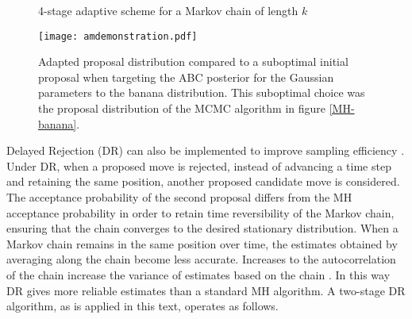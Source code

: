 \begin{figure}[h]
\begin{minipage}{1.0\linewidth}
\centering
\end{minipage}

\caption{4-stage adaptive scheme for a Markov chain of length $k$}
\label{4-stage-am}
\end{figure}

\begin{figure}[H]
	\centering
	\texttt{[image: amdemonstration.pdf]}
	\caption{Adapted proposal distribution compared to a suboptimal initial proposal when targeting the ABC posterior for the Gaussian parameters to the banana distribution. This suboptimal choice was the proposal distribution of the MCMC algorithm in figure \ref{MH-banana}.}
	\label{AM-demonstration}
\end{figure}

Delayed Rejection (DR) can also be implemented to improve sampling efficiency \citep{Mira2001}. Under DR, when a proposed move is rejected, instead of advancing a time step and retaining the same position, another proposed candidate move is considered. The acceptance probability of the second proposal differs from the MH acceptance probability in order to retain time reversibility of the Markov chain, ensuring that the chain converges to the desired stationary distribution. When a Markov chain remains in the same position over time, the estimates obtained by averaging along the chain become less accurate. Increases to the autocorrelation of the chain increase the variance of estimates based on the chain \citep{Mira2001}. In this way DR gives more reliable estimates than a standard MH algorithm. A two-stage DR algorithm, as is applied in this text, operates as follows. \par

